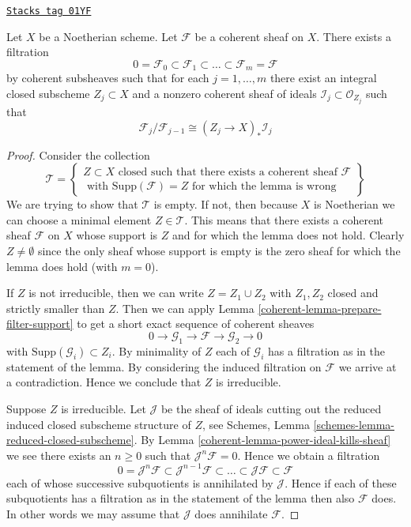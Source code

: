 \begin{lemma}
\label{coherent-lemma-coherent-filter}
\href{https://stacks.math.columbia.edu/tag/01YF}{\texttt{Stacks tag 01YF}}

Let $X$ be a Noetherian scheme.
Let $\mathcal{F}$ be a coherent sheaf on $X$.
There exists a filtration
$$
0 = \mathcal{F}_0 \subset \mathcal{F}_1 \subset
\ldots \subset \mathcal{F}_m = \mathcal{F}
$$
by coherent subsheaves such that for each $j = 1, \ldots, m$
there exist an integral closed subscheme $Z_j \subset X$ and
a nonzero coherent sheaf of ideals $\mathcal{I}_j \subset \mathcal{O}_{Z_j}$
such that
$$
\mathcal{F}_j/\mathcal{F}_{j - 1}
\cong (Z_j \to X)_* \mathcal{I}_j
$$
\end{lemma}

\begin{proof}

Consider the collection
$$
\mathcal{T} =
\left\{
\begin{matrix}
Z \subset X
\text{ closed such that there exists a coherent sheaf }
\mathcal{F} \\
\text{ with }
\text{Supp}(\mathcal{F}) = Z
\text{ for which the lemma is wrong}
\end{matrix}
\right\}
$$
We are trying to show that $\mathcal{T}$ is empty. If not, then
because $X$ is Noetherian we can choose a minimal element
$Z \in \mathcal{T}$. This means that there exists a coherent
sheaf $\mathcal{F}$ on $X$ whose support is $Z$ and for which the
lemma does not hold. Clearly $Z \not = \emptyset$ since the only
sheaf whose support is empty is the zero sheaf for which the
lemma does hold (with $m = 0$).

\medskip\noindent
If $Z$ is not irreducible, then we can write $Z = Z_1 \cup Z_2$
with $Z_1, Z_2$ closed and strictly smaller than $Z$.
Then we can apply Lemma \ref{coherent-lemma-prepare-filter-support}
to get a short exact sequence of coherent sheaves
$$
0 \to
\mathcal{G}_1 \to
\mathcal{F} \to
\mathcal{G}_2 \to 0
$$
with $\text{Supp}(\mathcal{G}_i) \subset Z_i$. By minimality of
$Z$ each of $\mathcal{G}_i$ has a filtration as in the statement
of the lemma. By considering the induced filtration on $\mathcal{F}$
we arrive at a contradiction. Hence we conclude
that $Z$ is irreducible.

\medskip\noindent
Suppose $Z$ is irreducible. Let $\mathcal{J}$ be the sheaf of ideals
cutting out the reduced induced closed subscheme structure of $Z$,
see Schemes, Lemma \ref{schemes-lemma-reduced-closed-subscheme}.
By Lemma \ref{coherent-lemma-power-ideal-kills-sheaf} we see there exists
an $n \geq 0$ such that $\mathcal{J}^n\mathcal{F} = 0$. Hence we obtain
a filtration
$$
0 = \mathcal{J}^n\mathcal{F} \subset \mathcal{J}^{n - 1}\mathcal{F}
\subset \ldots \subset \mathcal{J}\mathcal{F} \subset \mathcal{F}
$$
each of whose successive subquotients is annihilated by $\mathcal{J}$.
Hence if each of these subquotients has a filtration as in the statement
of the lemma then also $\mathcal{F}$ does. In other words we may
assume that $\mathcal{J}$ does annihilate $\mathcal{F}$.


\end{proof}
